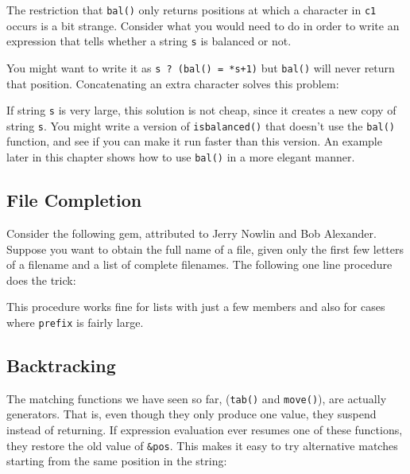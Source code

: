 The restriction that \texttt{bal()} only returns positions at which a
character in \texttt{c1} occurs is a bit strange. Consider what you
would need to do in order to write an expression that tells whether a
string \texttt{s} is balanced or not.

You might want to write it as \texttt{s ? (bal() = *s+1)} but
\texttt{bal()} will never return that position. Concatenating an extra
character solves this problem:


If string \texttt{s} is very large, this solution is not cheap, since it
creates a new copy of string \texttt{s}. You might write a version of
\texttt{isbalanced()} that doesn't use the
\texttt{bal()} function, and see if you can make it run faster than
this version. An example later in this chapter shows how to use
\texttt{bal()} in a more elegant manner.

\subsection{File Completion}

Consider the following gem, attributed to Jerry Nowlin and Bob Alexander. Suppose you want
to obtain the full name of a file, given only the first few letters of
a filename and a list of complete filenames.
The following one line procedure does the trick:


This procedure works fine for lists with just a few members and also for
cases where \texttt{prefix} is fairly large.

\subsection{Backtracking}

The matching functions we have seen so far,
(\texttt{tab()} and \texttt{move()}), are actually
generators. That is, even though they only produce one
value, they suspend instead of returning. If expression evaluation ever
resumes one of these functions, they restore the old value of
\texttt{\&pos}. This makes it easy to try alternative matches starting
from the same position in the string:

